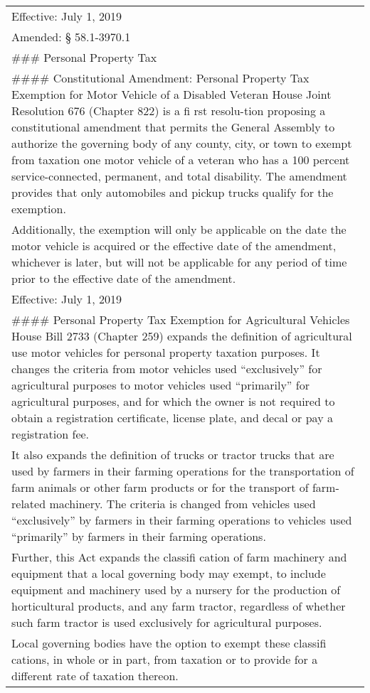 \documentclass[
]{book}
\begin{document}
\begin{longtable}[]{@{}
  >{\raggedright\arraybackslash}p{}@{}}
Effective: July 1, 2019 \\
Amended: § 58.1-3970.1 \\
\#\#\# Personal Property Tax \\
\#\#\#\# Constitutional Amendment: Personal Property Tax Exemption for Motor Vehicle of a Disabled Veteran
House Joint Resolution 676 (Chapter 822) is a fi rst resolu-tion proposing a constitutional amendment that permits the General Assembly to authorize the governing body of any county, city, or town to exempt from taxation one motor vehicle of a veteran who has a 100 percent service-connected, permanent, and total disability. The amendment provides that only automobiles and pickup trucks qualify for the exemption. \\
Additionally, the exemption will only be applicable on the date the motor vehicle is acquired or the effective date of the amendment, whichever is later, but will not be applicable for any period of time prior to the effective date of the amendment. \\
Effective: July 1, 2019 \\
\#\#\#\# Personal Property Tax Exemption for Agricultural Vehicles
House Bill 2733 (Chapter 259) expands the definition of agricultural use motor vehicles for personal property taxation purposes. It changes the criteria from motor vehicles used ``exclusively'' for agricultural purposes to motor vehicles used ``primarily'' for agricultural purposes, and for which the owner is not required to obtain a registration certificate, license plate, and decal or pay a registration fee. \\
It also expands the definition of trucks or tractor trucks that are used by farmers in their farming operations for the transportation of farm animals or other farm products or for the transport of farm-related machinery. The criteria is changed from vehicles used ``exclusively'' by farmers in their farming operations to vehicles used ``primarily'' by farmers in their farming operations. \\
Further, this Act expands the classifi cation of farm machinery and equipment that a local governing body may exempt, to include equipment and machinery used by a nursery for the production of horticultural products, and any farm tractor, regardless of whether such farm tractor is used exclusively for agricultural purposes. \\
Local governing bodies have the option to exempt these classifi cations, in whole or in part, from taxation or to provide for a different rate of taxation thereon. \\

\end{longtable}
\end{document}

